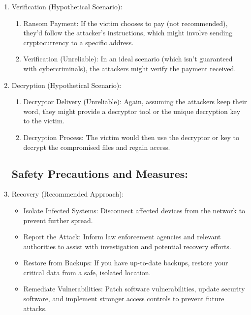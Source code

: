 \documentclass[12pt,twocolumn]{article}
\begin{document}
\begin{enumerate}[label=\arabic*.]
        \item Verification (Hypothetical Scenario):

            \begin{enumerate}[label=\alph*.]
                \item Ransom Payment: If the victim chooses to pay (not recommended), they'd follow the attacker's instructions, which might involve sending cryptocurrency to a specific address.
    
                \item Verification (Unreliable): In an ideal scenario (which isn't guaranteed with cybercriminals), the attackers might verify the payment received.
            \end{enumerate}
        
        \item Decryption (Hypothetical Scenario):

            \begin{enumerate}[label=\alph*.]
                \item Decryptor Delivery (Unreliable): Again, assuming the attackers keep their word, they might provide a decryptor tool or the unique decryption key to the victim.

                \item Decryption Process: The victim would then use the decryptor or key to decrypt the compromised files and regain access.
            \end{enumerate}

\subsection{Safety Precautions and Measures:}
    \item Recovery (Recommended Approach):
        \begin{itemize}
            \item Isolate Infected Systems: Disconnect affected devices from the network to prevent further spread.

            \item Report the Attack: Inform law enforcement agencies and relevant authorities to assist with investigation and potential recovery efforts.

            \item Restore from Backups: If you have up-to-date backups, restore your critical data from a safe, isolated location.
    
            \item Remediate Vulnerabilities: Patch software vulnerabilities, update security software, and implement stronger access controls to prevent future attacks.
    
        \end{itemize}
    
\end{enumerate}
\end{document}
